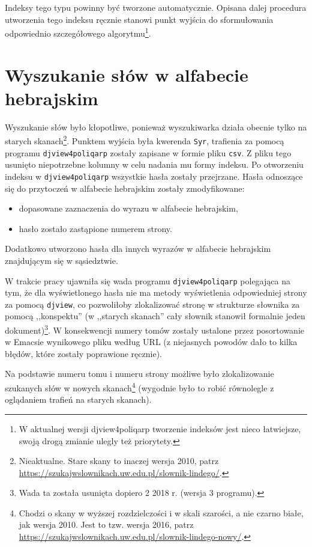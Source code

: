 \documentclass[12]{mwart}
\begin{document}
Indeksy tego typu powinny być tworzone automatycznie. Opisana dalej
procedura utworzenia tego indeksu ręcznie stanowi punkt wyjścia do
sformułowania odpowiednio szczegółowego algorytmu\footnote{W aktualnej
  wersji \textsf{djview4poliqarp} tworzenie indeksów jest nieco
  łatwiejsze, swoją drogą zmianie ulegly też priorytety.}.

\section{Wyszukanie słów w alfabecie hebrajskim}
\label{sec:wyszukanie-sow-w}

Wyszukanie słów było kłopotliwe, ponieważ wyszukiwarka działa obecnie
tylko na starych skanach\footnote{Nieaktualne. Stare skany to inaczej
  wersja 2010, patrz
  \url{https://szukajwslownikach.uw.edu.pl/slownik-lindego/}.}. Punktem
wyjścia była kwerenda \texttt{Syr}, trafienia za pomocą programu
\texttt{djview4poliqarp} zostały zapisane w formie pliku
\texttt{csv}. Z pliku tego usunięto niepotrzebne kolumny w celu
nadania mu formy indeksu. Po otworzeniu indeksu w
\texttt{djview4poliqarp} wszystkie hasła zostały przejrzane. Hasła
odnoszące się do przytoczeń w alfabecie hebrajskim zostały
zmodyfikowane:
\begin{itemize}
\item dopasowane zaznaczenia do wyrazu w alfabecie hebrajskim,
\item hasło zostało zastąpione numerem strony.
\end{itemize}
Dodatkowo utworzono hasła dla innych wyrazów w alfabecie hebrajskim
znajdującym się w sąsiedztwie.

W trakcie pracy ujawniła się wada programu \texttt{djview4poliqarp}
polegająca na tym, że dla wyświetlonego hasła nie ma metody
wyświetlenia odpowiedniej strony za pomocą \texttt{djview}, co
pozwoliłoby zlokalizować stronę w strukturze słownika za pomocą
,,konspektu'' (w ,,starych skanach'' cały słownik stanowił formalnie
jeden dokument)\footnote{Wada ta została usunięta dopiero 2 2018
  r. (wersja 3 programu).}. W konsekwencji numery tomów zostały
ustalone przez posortowanie w Emacsie wynikowego pliku według URL (z
niejasnych powodów dało to kilka błędów, które zostały poprawione
ręcznie).

Na podstawie numeru tomu i numeru strony możliwe było zlokalizowanie
szukanych słów w nowych skanach\footnote{Chodzi o skany w wyższej
  rozdzielczości i w skali szarości, a nie czarno białe, jak wersja
  2010. Jest to tzw. wersja 2016, patrz
  \url{https://szukajwslownikach.uw.edu.pl/slownik-lindego-nowy/}.}
(wygodnie było to robić równolegle z oglądaniem trafień na starych
skanach).
\end{document}
